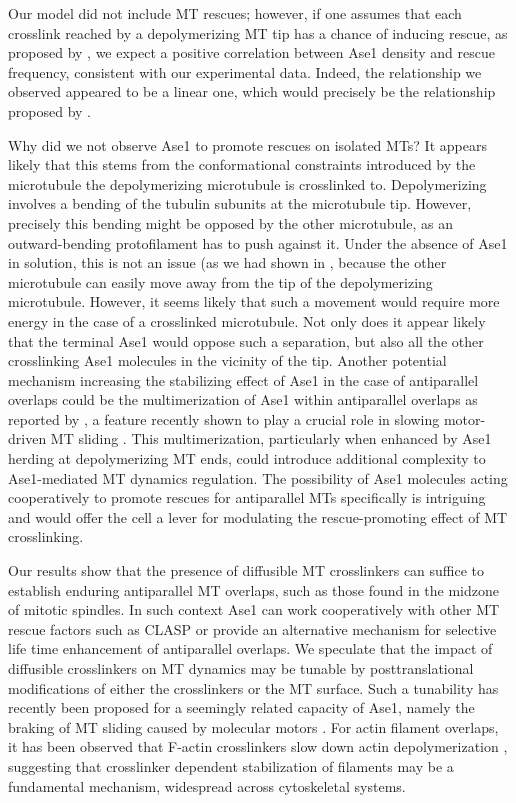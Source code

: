 Our model did not include MT rescues; however, if one assumes that each crosslink reached by a depolymerizing MT tip has a chance of inducing rescue, as proposed by \cite{Stoppin-Mellet2013}, we expect a positive correlation between Ase1 density and rescue frequency, consistent with our experimental data. Indeed, the relationship we observed appeared to be a linear one, which would precisely be the relationship proposed by \cite{Stoppin-Mellet2013}.\par 

Why did we not observe Ase1 to promote rescues on isolated MTs? It appears likely that this stems from the conformational constraints introduced by the microtubule the depolymerizing microtubule is crosslinked to. Depolymerizing involves a bending of the tubulin subunits at the microtubule tip. However, precisely this bending might be opposed by the other microtubule, as an outward-bending protofilament has to push against it. Under the absence of Ase1 in solution, this is not an issue (as we had shown in , because the other microtubule can easily move away from the tip of the depolymerizing microtubule. However, it seems likely that such a movement would require more energy in the case of a crosslinked microtubule. Not only does it appear likely that the terminal Ase1 would oppose such a separation, but also all the other crosslinking Ase1 molecules in the vicinity of the tip. Another potential mechanism increasing the stabilizing effect of Ase1 in the case of antiparallel overlaps could be the multimerization of Ase1 within antiparallel overlaps as reported by \cite{Kapitein2008}, a feature recently shown to play a crucial role in slowing motor-driven MT sliding \parencite{alfieri2021two}. This multimerization, particularly when enhanced by Ase1 herding at depolymerizing MT ends, could introduce additional complexity to Ase1-mediated MT dynamics regulation. The possibility of Ase1 molecules acting cooperatively to promote rescues for antiparallel MTs specifically is intriguing and would offer the cell a lever for modulating the rescue-promoting effect of MT crosslinking. \par
 
Our results show that the presence of diffusible MT crosslinkers can suffice to establish enduring antiparallel MT overlaps, such as those found in the midzone of mitotic spindles. In such context Ase1 can work cooperatively with other MT rescue factors such as CLASP \parencite{Bratman2007b} or provide an alternative mechanism for selective life time enhancement of antiparallel overlaps. We speculate that the impact of diffusible crosslinkers on MT dynamics may be tunable by posttranslational modifications of either the crosslinkers or the MT surface. Such a tunability has recently been proposed for a seemingly related capacity of Ase1, namely the braking of MT sliding caused by molecular motors \parencite{fu2009phospho, Thomas2020}. For actin filament overlaps, it has been observed that F-actin crosslinkers slow down actin depolymerization \parencite{maul2003eplin,schmoller2011slow}, suggesting that crosslinker dependent stabilization of filaments may be a fundamental mechanism, widespread across cytoskeletal systems.
